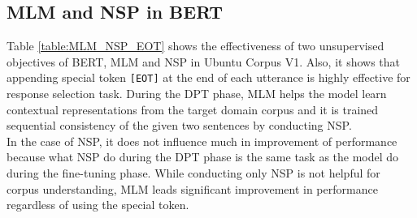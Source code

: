\documentclass[a4paper]{article}
\begin{document}
\subsection{MLM and NSP in BERT}
Table \ref{table:MLM_NSP_EOT} shows the effectiveness of two unsupervised objectives of BERT, MLM and NSP in Ubuntu Corpus V1. Also, it shows that appending special token {\normalsize{\verb|[EOT]|}} at the end of each utterance is highly effective for response selection task. During the DPT phase, MLM helps the model learn contextual representations from the target domain corpus and it is trained  sequential consistency of the given two sentences by conducting NSP.\\
\indent In the case of NSP, it does not influence much in improvement of performance because what NSP do during the DPT phase is the same task as the model do during the fine-tuning phase. While conducting only NSP is not helpful for corpus understanding, MLM leads significant improvement in performance regardless of using the special token. 
\end{document}

